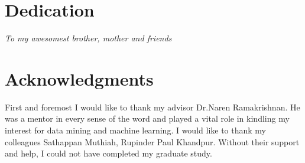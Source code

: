 \documentclass[12pt]{report}
\begin{document}
\chapter*{Dedication}
\vspace*{\fill}
\begin{center}
\Large\textit{To my awesomest brother, mother and friends}
\end{center}
\vspace{\fill}

\chapter*{Acknowledgments}
\vspace*{\fill}
\Large{First and foremost I would like to thank my advisor Dr.Naren Ramakrishnan. He was a mentor in every sense of the word and played a vital role in kindling my interest for data mining and machine learning.
\newline I would like to thank my colleagues Sathappan Muthiah, Rupinder Paul Khandpur. Without their support and help, I could not have completed my graduate study. 
}
\vspace{\fill}

\tableofcontents
\pagebreak

\listoffigures
\pagebreak

\listoftables
\pagebreak

\pagestyle{myheadings}









%
%

%

\end{document}
